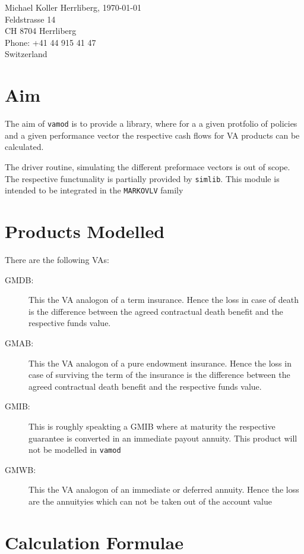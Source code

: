 \documentclass[10pt, a4paper,landscape]{article}
\begin{document}
\begin{flushleft}
Michael Koller \hfill Herrliberg, \today \\
Feldstrasse 14 \\
CH 8704 Herrliberg \\
Phone: +41 44 915 41 47\\
Switzerland \\[1cm]
\end{flushleft}

\tableofcontents

\section{Aim}
The aim of {\tt vamod} is to provide a library, where for a a given protfolio of policies and a given performance vector the respective cash flows for VA products can be calculated.

The driver routine, simulating the different preformace vectors is out of scope. The respective functunality is partially provided by {\tt simlib}. This module is intended to be integrated in the {\tt MARKOVLV} family

\section{Products Modelled}
There are the following VAs:
\begin{description}
\item[GMDB:] This the VA analogon of a term insurance. Hence the loss in case of death is the difference between the agreed contractual death benefit and the respective funds value.
\item[GMAB:] This the VA analogon of a pure endowment insurance. Hence the loss in case of surviving the term of the insurance is the difference between the agreed contractual death benefit and the respective funds value.
\item[GMIB:] This is roughly speakting a GMIB where at maturity the respective guarantee is converted in an immediate payout annuity. This product will not be modelled in {\tt vamod}
\item[GMWB:] This the VA analogon of an immediate or deferred annuity. Hence the loss are the annuityies which can not be taken out of the account value
\end{description}

\section{Calculation Formulae}
\end{document}
